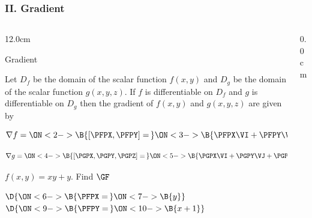 \begin{frame}
\frametitle{II. Gradient}
\scriptsize
\begin{columns}
\begin{column}{12.0cm}

\DEF Gradient

\vspace{0.2cm}

Let $D_f$ be the domain of the scalar function $f(x,y)$ and $D_g$ be the domain of the scalar function $g(x,y,z)$.  If $f$ is differentiable on $D_f$ and $g$ is differentiable on $D_g$ then the gradient of $f(x,y)$ and $g(x,y,z)$ are given by

\vspace{0.2cm}

$$\nabla f = \ON<2->{\B{\left[\PFPX,\PFPY\right] =\,}} \ON<3->{\B{\PFPX \VI + \PFPY \VJ}}$$

\vspace{0.2cm}

$$\nabla g = \ON<4->{\B{\left[\PGPX,\PGPY,\PGPZ\right] =\,}} \ON<5->{\B{\PGPX \VI + \PGPY \VJ + \PGPZ \VK}}$$

\vspace{0.8cm}

\EX $f(x,y) = xy + y$. \quad Find $\GF$

\vspace{0.2cm}

\SOL

\vspace{0.2cm}

$\D{\ON<6->{\B{\PFPX =\,}} 
\ON<7->{\B{y}}}$ \quad 
{} \quad $\D{
\ON<9->{\B{\PFPY =\,}} 
\ON<10->{\B{x + 1}}}$ \quad 
{} \quad 
{}

\end{column}
\begin{column}{0.0cm}\end{column}
\end{columns}
\end{frame}

